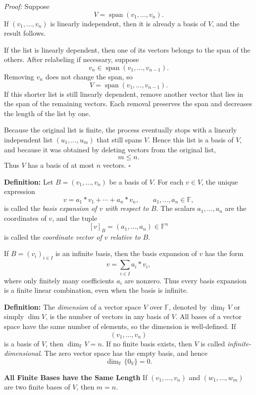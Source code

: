 \documentclass[a4paper,11pt,abstract=true]{scrartcl}
\theoremstyle{dotlessP}
\theoremstyle{dotlessS}
\theoremstyle{remark}
\theoremstyle{definition}
\begin{document}
\begin{claim_box}
\textit{Proof:} Suppose
\[
V=\operatorname{span}(v_1,\ldots,v_n).
\]
If $(v_1,\ldots,v_n)$ is linearly independent, then it is already a basis of
$V$, and the result follows.

If the list is linearly dependent, then one of its vectors belongs to the
span of the others. After relabeling if necessary, suppose
\[
v_n\in\operatorname{span}(v_1,\ldots,v_{n-1}).
\]
Removing $v_n$ does not change the span, so
\[
V=\operatorname{span}(v_1,\ldots,v_{n-1}).
\]
If this shorter list is still linearly dependent, remove another vector that
lies in the span of the remaining vectors. Each removal preserves the span
and decreases the length of the list by one.

Because the original list is finite, the process eventually stops with a
linearly independent list $(u_1,\ldots,u_m)$ that still spans $V$. Hence this
list is a basis of $V$, and because it was obtained by deleting vectors from
the original list,
\[
m\leq n.
\]
Thus $V$ has a basis of at most $n$ vectors. \hfill$\square$
\end{claim_box}

\textbf{Definition:} Let
$B=(v_1,\ldots,v_n)$ be a basis of $V$. For each $v\in V$, the unique
expression
\[
v=a_1*v_1+\cdots+a_n*v_n,
\qquad a_1,\ldots,a_n\in \mathbb{F},
\]
is called the \emph{basis expansion of $v$ with respect to $B$}. The scalars
$a_1,\ldots,a_n$ are the coordinates of $v$, and the tuple
\[
{[v]}_B=(a_1,\ldots,a_n)\in \mathbb{F}^n
\]
is called the \emph{coordinate vector of $v$ relative to $B$}.

If $B={(v_i)}_{i\in I}$ is an infinite basis, then the basis expansion of $v$
has the form
\[
v=\sum_{i\in I}a_i*v_i,
\]
where only finitely many coefficients $a_i$ are nonzero. Thus every basis
expansion is a finite linear combination, even when the basis is infinite.

\textbf{Definition:} The \emph{dimension} of a vector space $V$
over $\mathbb{F}$, denoted by $\dim_{\mathbb{F}} V$ or simply $\dim V$, is the number of vectors
in any basis of $V$. All bases of a vector space have the same number of
elements, so the dimension is well-defined. If
\[
(v_1,\ldots,v_n)
\]
is a basis of $V$, then $\dim_{\mathbb{F}} V=n$. If no finite basis exists, then $V$ is
called \emph{infinite-dimensional}. The zero vector space has the empty basis,
and hence
\[
\dim_{\mathbb{F}}\{0_V\}=0.
\]

\begin{problem_box}
\textbf{All Finite Bases have the Same Length}
If
$(v_1,\ldots,v_n)$ and $(w_1,\ldots,w_m)$ are two finite bases of $V$, then
$m=n$.
\end{problem_box}
\end{document}
